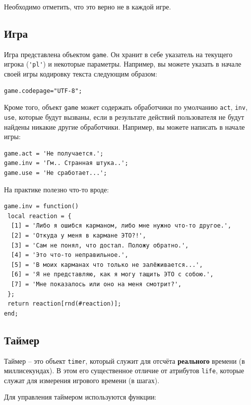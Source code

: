 \documentclass[a4paper,12pt]{article}
\begin{document}
Необходимо отметить, что это верно не в каждой игре.

\subsection{Игра}

Игра представлена объектом \verb/game/. Он хранит в себе указатель на текущего игрока (\verb/'pl'/) и некоторые параметры. Например, вы можете указать в начале своей игры кодировку текста следующим образом:

\begin{verbatim}
game.codepage="UTF-8";
\end{verbatim}

Кроме того, объект \verb/game/ может содержать обработчики по умолчанию \verb/act/, \verb/inv/, \verb/use/, которые будут вызваны, если в результате действий пользователя не будут найдены никакие другие обработчики. Например, вы можете написать в начале игры:

\begin{verbatim}
game.act = 'Не получается.';
game.inv = 'Гм.. Странная штука..';
game.use = 'Не сработает...';
\end{verbatim}

На практике полезно что-то вроде:

\begin{verbatim}
game.inv = function()
 local reaction = {
  [1] = 'Либо я ошибся карманом, либо мне нужно что-то другое.',
  [2] = 'Откуда у меня в кармане ЭТО?!',
  [3] = 'Сам не понял, что достал. Положу обратно.',
  [4] = 'Это что-то неправильное.',
  [5] = 'В моих карманах что только не залёживается...',
  [6] = 'Я не представляю, как я могу тащить ЭТО с собою.',
  [7] = 'Мне показалось или оно на меня смотрит?',
 };
 return reaction[rnd(#reaction)];
end;
\end{verbatim}

\subsection{Таймер}
\label{objects_timer}
Таймер -- это объект \verb/timer/, который служит для отсчёта \textbf{реального} времени (в миллисекундах). В этом его существенное отличие от атрибутов \verb/life/, которые служат для измерения игрового времени (в шагах).

Для управления таймером используются функции:
\end{document}
